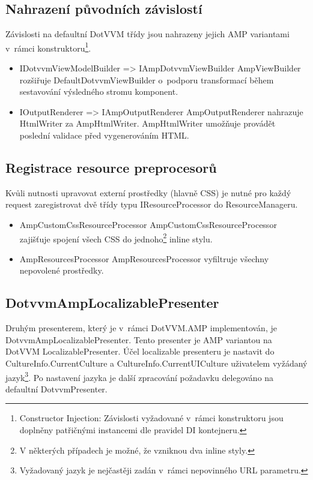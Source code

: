 \subsection*{Nahrazení původních závislostí}
Závislosti na defaultní DotVVM třídy jsou nahrazeny jejich AMP variantami v~rámci konstruktoru\footnote{Constructor Injection: Závislosti vyžadované v~rámci konstruktoru jsou doplněny patřičnými instancemi dle pravidel DI kontejneru.}.

\begin{itemize}
    \item IDotvvmViewModelBuilder => IAmpDotvvmViewBuilder \newline
    AmpViewBuilder rozšiřuje DefaultDotvvmViewBuilder o~podporu transformací během sestavování výsledného stromu komponent.
    \item IOutputRenderer => IAmpOutputRenderer \newline
    AmpOutputRenderer nahrazuje HtmlWriter za AmpHtmlWriter. AmpHtmlWriter umožňuje provádět poslední validace před vygenerováním HTML.
\end{itemize}

\subsection*{Registrace resource preprocesorů}
Kvůli nutnosti upravovat externí prostředky (hlavně CSS) je nutné pro každý request zaregistrovat dvě třídy typu IResourceProcessor do ResourceManageru.
\begin{itemize}
    \item AmpCustomCssResourceProcessor \newline
    AmpCustomCssResourceProcessor zajišťuje spojení všech CSS do jednoho\footnote{V některých případech je možné, že vzniknou dva inline styly.} inline stylu.
    \item AmpResourcesProcessor \newline
    AmpResourcesProcessor vyfiltruje všechny nepovolené prostředky.
\end{itemize}

\subsection*{DotvvmAmpLocalizablePresenter}
Druhým presenterem, který je v~rámci DotVVM.AMP implementován, je DotvvmAmpLocalizablePresenter. Tento presenter je AMP variantou na DotVVM LocalizablePresenter.
Účel localizable presenteru je nastavit do  CultureInfo.CurrentCulture a CultureInfo.CurrentUICulture uživatelem vyžádaný jazyk\footnote{Vyžadovaný jazyk je nejčastěji zadán v~rámci nepovinného URL parametru.}. Po nastavení jazyka je další zpracování požadavku delegováno na defaultní DotvvmPresenter.

